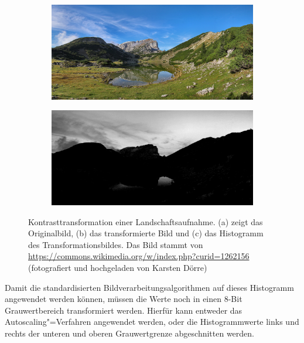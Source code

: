 \documentclass[12pt,a4paper,titlepage]{scrartcl}
\begin{document}
\begin{figure}[ht]
\centering
\begin{subfigure}[c]{0.49\textwidth}
\includegraphics[width=\textwidth]{../Bilder/Zireiner_See_Rofanspitze_2006_10.jpg}
\label{simg:Orig}
\end{subfigure}
%
\begin{subfigure}[c]{0.49\textwidth}
\includegraphics[width=\textwidth]{../Bilder/Sky_Blackening_FirstStep.jpg}
\label{simg:Trans}
\end{subfigure}
%
\begin{subfigure}[c]{0.9\textwidth}

\label{simg:Hist}
\end{subfigure}
\caption[Kontrasttransformation für sky blackening]{Kontrasttransformation einer Landschaftsaufnahme. (a) zeigt das Originalbild, (b) das transformierte Bild und (c) das Histogramm des Transformationsbildes. Das Bild stammt von \url{https://commons.wikimedia.org/w/index.php?curid=1262156} (fotografiert und hochgeladen von Karsten Dörre)}\label{img:sky_Trans}
\end{figure} 
Damit die standardisierten Bildverarbeitungsalgorithmen auf dieses Histogramm angewendet werden können, müssen die Werte noch in einen 8-Bit Grauwertbereich transformiert werden. Hierfür kann entweder das Autoscaling"=Verfahren angewendet werden, oder die Histogrammwerte links und rechts der unteren und oberen Grauwertgrenze abgeschnitten werden. 
\end{document}
